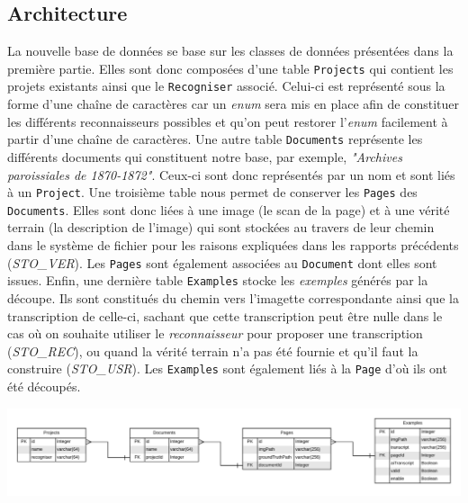 \subsection{Architecture}

La nouvelle base de données se base sur les classes de données présentées dans la première partie. Elles sont donc composées d'une table \texttt{Projects} qui contient les projets existants ainsi que le \texttt{Recogniser} associé. Celui-ci est représenté sous la forme d'une chaîne de caractères car un \textit{enum} sera mis en place afin de constituer les différents reconnaisseurs possibles et qu'on peut restorer l'\textit{enum} facilement à partir d'une chaîne de caractères. Une autre table \texttt{Documents} représente les différents documents qui constituent notre base, par exemple, \textit{"Archives paroissiales de 1870-1872"}. Ceux-ci sont donc représentés par un nom et sont liés à un \texttt{Project}. Une troisième table nous permet de conserver les \texttt{Pages} des \texttt{Documents}. Elles sont donc liées à une image (le scan de la page) et à une vérité terrain (la description de l'image) qui sont stockées au travers de leur chemin dans le système de fichier pour les raisons expliquées dans les rapports précédents (\textit{STO\_VER}). Les \texttt{Pages} sont également associées au \texttt{Document} dont elles sont issues. Enfin, une dernière table \texttt{Examples} stocke les \textit{exemples} générés par la découpe. Ils sont constitués du chemin vers l'imagette correspondante ainsi que la transcription de celle-ci, sachant que cette transcription peut être nulle dans le cas où on souhaite utiliser le \textit{reconnaisseur} pour proposer une transcription (\textit{STO\_REC}), ou quand la vérité terrain n'a pas été fournie et qu'il faut la construire (\textit{STO\_USR}). Les \texttt{Examples} sont également liés à la \texttt{Page} d'où ils ont été découpés.

\begin{mdframed}[frametitle={Figure 10 : Structure de la base de données}, innerbottommargin=10]
\begin{center}
\includegraphics[scale=0.53]{assets/DatabaseEntity.pdf}
\end{center}
\end{mdframed}

